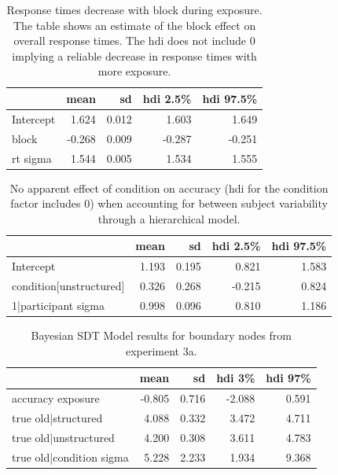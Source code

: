 \begin{table}
    \caption{Response times decrease with block during exposure. The table shows an estimate of the block effect on overall response times. The hdi does not include 0 implying a reliable decrease in response times with more exposure.}
    \label{tab:rt-block-hdi}
    \begin{tabular}{lrrrr}
        \toprule
         & mean & sd & hdi 2.5\% & hdi 97.5\% \\
        \midrule
        Intercept & 1.624 & 0.012 & 1.603 & 1.649 \\
        block & -0.268 & 0.009 & -0.287 & -0.251 \\
        rt sigma & 1.544 & 0.005 & 1.534 & 1.555 \\
        \bottomrule
        \end{tabular}        
\end{table}

\begin{table}
    \caption{No apparent effect of condition on accuracy (hdi for the condition factor includes 0) when accounting for between subject variability through a hierarchical model.}
    \label{tab:acc-cond-hrl-hdi}
    \begin{tabular}{lrrrr}
        \toprule
         & mean & sd & hdi 2.5\% & hdi 97.5\% \\
        \midrule
        Intercept & 1.193 & 0.195 & 0.821 & 1.583 \\
        condition[unstructured] & 0.326 & 0.268 & -0.215 & 0.824 \\
        1|participant sigma & 0.998 & 0.096 & 0.810 & 1.186 \\
        \bottomrule
        \end{tabular}
\end{table}

\begin{table}[H]
    \centering
    \caption{Bayesian SDT Model results for boundary nodes from experiment 3a. }
    \label{tab:exp3-bayesmodel-boundary-sdt}
    \begin{tabular}{lrrrr}
        \toprule
         & mean & sd & hdi 3\% & hdi 97\% \\
        \midrule
        accuracy exposure & -0.805 & 0.716 & -2.088 & 0.591 \\
        true old|structured & 4.088 & 0.332 & 3.472 & 4.711 \\
        true old|unstructured & 4.200 & 0.308 & 3.611 & 4.783 \\
        true old|condition sigma & 5.228 & 2.233 & 1.934 & 9.368 \\
        \bottomrule
        \end{tabular}        
\end{table}

